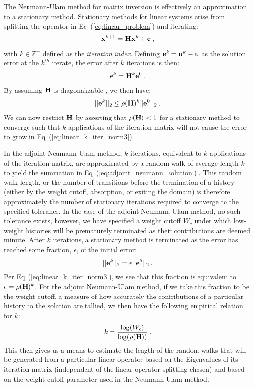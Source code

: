 \documentclass{mc2013}
\begin{document}
The Neumann-Ulam method for matrix inversion is effectively an
approximation to a stationary method. Stationary methods for linear
systems arise from splitting the operator in
Eq~(\ref{eq:linear_problem}) and iterating:
\begin{equation}
  \mathbf{x}^{k+1} = \mathbf{H}\mathbf{x}^k + \mathbf{c}\:,
  \label{eq:linear_iterative_method}
\end{equation}
with $k \in \mathbb{Z}^+$ defined as the \textit{iteration
  index}. Defining $\mathbf{e}^k = \mathbf{u}^k - \mathbf{u}$ as the solution
error at the $k^{th}$ iterate, the error after $k$ iterations is then:
\begin{equation}
  \mathbf{e}^{k} = \mathbf{H}^k\mathbf{e}^0\:. 
  \label{eq:linear_k_iter_error}
\end{equation}
By assuming $\mathbf{H}$ is diagonalizable \cite{leveque_finite_2007}, we
then have:
\begin{equation}
  ||\mathbf{e}^{k}||_2 \leq \rho(\mathbf{H})^k ||\mathbf{e}^0||_2\:.
  \label{eq:linear_k_iter_norm3}
\end{equation}
We can now restrict $\mathbf{H}$ by asserting that $\rho(\mathbf{H}) < 1$
for a stationary method to converge such that $k$ applications of the
iteration matrix will not cause the error to grow in
Eq~(\ref{eq:linear_k_iter_norm3}). 

In the adjoint Neumann-Ulam method, $k$ iterations, equivalent to $k$
applications of the iteration matrix, are approximated by a random
walk of average length $k$ to yield the summation in
Eq~(\ref{eq:adjoint_neumann_solution})
\cite{dimov_new_1998,halton_sequential_1994,danilov_asymptotic_2000}. This
random walk length, or the number of transitions before the
termination of a history (either by the weight cutoff, absorption, or
exiting the domain) is therefore approximately the number of
stationary iterations required to converge to the specified
tolerance. In the case of the adjoint Neumann-Ulam method, no such
tolerance exists, however, we have specified a weight cutoff $W_c$
under which low-weight histories will be prematurely terminated as
their contributions are deemed minute. After $k$ iterations, a
stationary method is terminated as the error has reached some
fraction, $\epsilon$, of the initial error:
\begin{equation}
  ||\mathbf{e}^{k}||_2 = \epsilon ||\mathbf{e}^0||_2\:.
  \label{eq:linear_k_iter_norm4}
\end{equation}
Per Eq~(\ref{eq:linear_k_iter_norm3}), we see that this fraction is
equivalent to $\epsilon = \rho(\mathbf{H})^k$. For the adjoint Neumann-Ulam
method, if we take this fraction to be the weight cutoff, a measure of
how accurately the contributions of a particular history to the
solution are tallied, we then have the following empirical relation
for $k$:
\begin{equation}
  k = \frac{ \log(W_c) }{ \log( \rho(\mathbf{H}) ) }\:.
  \label{eq:analytic_k}
\end{equation}
This then gives us a means to estimate the length of the random walks
that will be generated from a particular linear operator based on the
Eigenvalues of its iteration matrix (independent of the linear
operator splitting chosen) and based on the weight cutoff parameter
used in the Neumann-Ulam method.
\end{document}
